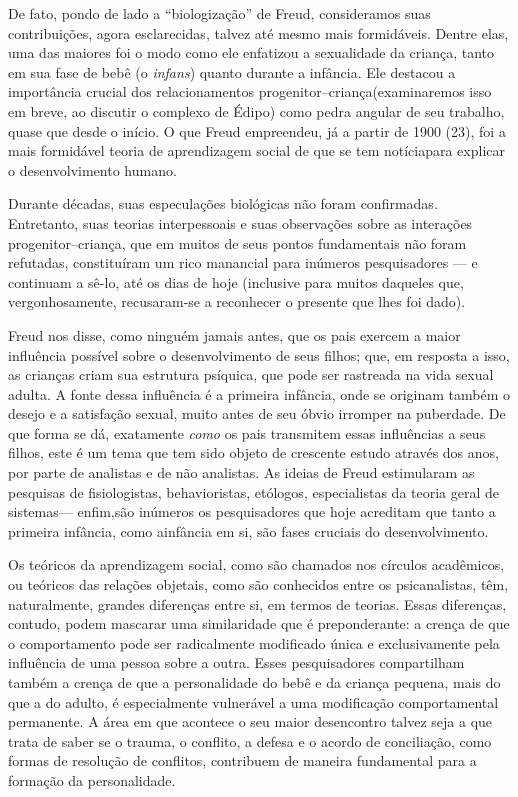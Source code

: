  De fato, pondo de lado a ``biologização'' de Freud, consideramos suas contribuições, agora esclarecidas, talvez até mesmo mais formidáveis. Dentre elas, uma das \mbox{maiores} foi o modo como ele enfatizou a sexualidade da \mbox{criança}, tanto em sua fase de bebê (o \textit{infans}) quanto durante a infância. Ele destacou a importância crucial dos relacionamentos progenitor--criança\idxrelpc[|(] (examinaremos isso em breve, ao discutir o complexo de Édipo) como pedra angular de seu trabalho, quase que desde o início. O que Freud empreendeu, já a partir de 1900 (23), foi a mais formidável teoria de aprendizagem social de que se tem notícia\idxbisse[|)] para explicar o desenvolvimento humano.

 Durante décadas, suas especulações biológicas não foram confirmadas.
Entretanto, suas teorias interpessoais\idxfreudinter{} e suas observações sobre as
interações progenitor--criança, que em muitos de seus pontos
fundamentais não foram refutadas, constituíram um rico manancial para
inúmeros pesquisadores --- e continuam a sê-lo, até os dias de hoje
(inclusive para muitos daqueles que, vergonhosamente, recusaram-se a
reconhecer o presente que lhes foi dado).

 Freud nos disse, como ninguém jamais antes, que os pais exercem a maior influência possível sobre o desenvolvimento de seus filhos; que, em resposta a isso, as crianças criam sua estrutura psíquica, que pode ser \mbox{rastreada} na vida sexual adulta. A fonte dessa influência é a primeira infância, onde se originam também o desejo e a satisfação sexual, muito antes de seu óbvio irromper na puberdade. De que forma se dá,
exatamente \textit{como} os pais transmitem essas influências a seus
filhos, este é um tema que tem sido objeto de crescente estudo através
dos anos, por parte de analistas e de não analistas. As ideias de Freud
estimularam as pesquisas de fisiologistas, behavioristas, etólogos,
especialistas da teoria geral de sistemas\idxbisseteor[|)] --- enfim,\idxfreud[|)] são inúmeros os
pesquisadores que hoje acreditam que tanto a primeira infância, como a\idxrelpc[|)]
infância em si, são fases cruciais do desenvolvimento.

 Os teóricos da aprendizagem social, como são chamados nos círculos
acadêmicos, ou teóricos das relações objetais, como são conhecidos
entre os psicanalistas, têm, naturalmente, grandes diferenças entre si,
em termos de teorias. Essas diferenças, contudo, podem mascarar uma
similaridade que é preponderante: a crença de que o comportamento pode
ser radicalmente modificado única e exclusivamente pela influência de
uma pessoa sobre a outra. Esses pesquisadores compartilham também a
crença de que a personalidade do bebê e da criança pequena, mais do que
a do adulto, é especialmente vulnerável a uma modificação
comportamental permanente. A área em que acontece o seu maior
desencontro talvez seja a que trata de saber se o trauma,\idxtrauma{} o conflito, a
defesa e o acordo de conciliação, como formas de resolução de
conflitos, contribuem de maneira fundamental para a formação da
personalidade.

